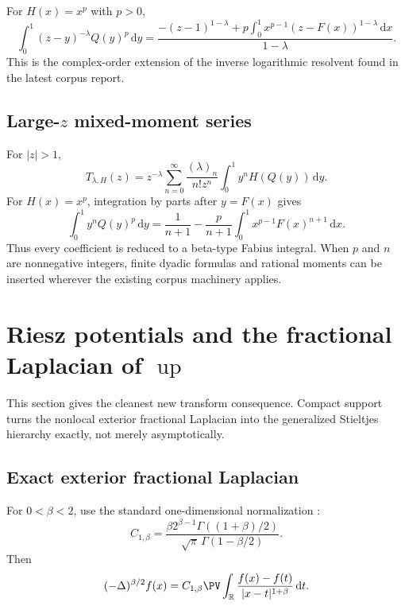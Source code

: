 \documentclass[11pt,oneside]{article}
\theoremstyle{definition}
\theoremstyle{remark}
\newcommand{\Up}{\operatorname{up}}
\newcommand{\R}{\mathbb R}
\newcommand{\dd}{\,\mathrm d}
\newcommand{\1}{\mathbf 1}
\begin{document}
For $H(x)=x^p$ with $p>0$,
\begin{equation}
 \int_0^1(z-y)^{-\lambda}Q(y)^p\dd y
 =\frac{-(z-1)^{1-\lambda}
  +p\int_0^1x^{p-1}(z-F(x))^{1-\lambda}\dd x}{1-\lambda}.
 \label{p9:eq:Q-power-complex-resolvent}
\end{equation}
This is the complex-order extension of the inverse logarithmic resolvent found
in the latest corpus report.

\subsection{Large-\texorpdfstring{$z$}{z} mixed-moment series}

For $|z|>1$,
\begin{equation}
 T_{\lambda,H}(z)
 =z^{-\lambda}\sum_{n=0}^{\infty}
  \frac{(\lambda)_n}{n!z^n}
  \int_0^1y^nH(Q(y))\dd y.
 \label{p9:eq:T-moment-series}
\end{equation}
For $H(x)=x^p$, integration by parts after $y=F(x)$ gives
\begin{equation}
 \int_0^1y^nQ(y)^p\dd y
 =\frac1{n+1}
  -\frac{p}{n+1}\int_0^1x^{p-1}F(x)^{n+1}\dd x.
 \label{p9:eq:mixed-inverse-moment}
\end{equation}
Thus every coefficient is reduced to a beta-type Fabius integral.  When $p$
and $n$ are nonnegative integers, finite dyadic formulas and rational moments
can be inserted wherever the existing corpus machinery applies.

\section{Riesz potentials and the fractional Laplacian of \texorpdfstring{$\Up$}{up}}
\label{p9:sec:Riesz}

This section gives the cleanest new transform consequence.  Compact support
turns the nonlocal exterior fractional Laplacian into the generalized
Stieltjes hierarchy exactly, not merely asymptotically.

\subsection{Exact exterior fractional Laplacian}

For $0<\beta<2$, use the standard one-dimensional normalization
\cite{p9:Kwasnicki2017}:
\begin{equation}
 C_{1,\beta}
 =\frac{\beta2^{\beta-1}\Gamma((1+\beta)/2)}
       {\sqrt\pi\,\Gamma(1-\beta/2)}.
 \label{p9:eq:C1beta}
\end{equation}
Then
\begin{equation}
 (-\Delta)^{\beta/2}f(x)
 =C_{1,\beta}\PV\int_{\R}
   \frac{f(x)-f(t)}{|x-t|^{1+\beta}}\dd t.
 \label{p9:eq:frac-lap-singular}
\end{equation}
\end{document}
